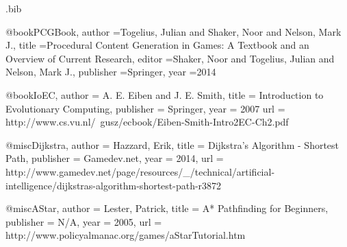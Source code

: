 \begin{filecontents*}{\jobname.bib}

@book{PCGBook,
	author	={Togelius, Julian and Shaker, Noor and Nelson, Mark J.},
	title		={Procedural Content Generation in Games: A Textbook and an Overview of Current Research},
	editor		={Shaker, Noor and Togelius, Julian and Nelson, Mark J.},
	publisher	={Springer},
	year		={2014}
}

@book{IoEC,
	author 	= {A. E. Eiben and J. E. Smith},
	title 		= {Introduction to Evolutionary Computing},
	publisher 	= {Springer},
	year 		= {2007}
	url 		= {http://www.cs.vu.nl/~gusz/ecbook/Eiben-Smith-Intro2EC-Ch2.pdf}
}

@misc{Dijkstra,
	author 	= {Hazzard, Erik},
	title 		= {Dijkstra's Algorithm - Shortest Path},
	publisher 	= {Gamedev.net},
	year 		= {2014}, 
	url 		= {http://www.gamedev.net/page/resources/\_/technical/artificial-intelligence/dijkstras-algorithm-shortest-path-r3872}
}

@misc{AStar,
	author 	= {Lester, Patrick},
	title 		= {A* Pathfinding for Beginners},
	publisher 	= {N/A},
	year 		= {2005}, 
	url 		= {http://www.policyalmanac.org/games/aStarTutorial.htm}
}

\end{filecontents*}

\nocite{*}
